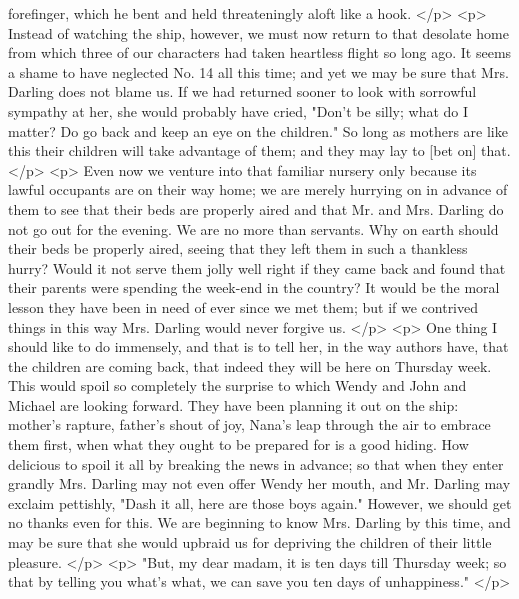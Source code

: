       forefinger, which he bent and held threateningly aloft like a hook.
    </p>
    <p>
      Instead of watching the ship, however, we must now return to that desolate
      home from which three of our characters had taken heartless flight so long
      ago. It seems a shame to have neglected No. 14 all this time; and yet we
      may be sure that Mrs. Darling does not blame us. If we had returned sooner
      to look with sorrowful sympathy at her, she would probably have cried,
      "Don't be silly; what do I matter? Do go back and keep an eye on the
      children." So long as mothers are like this their children will take
      advantage of them; and they may lay to [bet on] that.
    </p>
    <p>
      Even now we venture into that familiar nursery only because its lawful
      occupants are on their way home; we are merely hurrying on in advance of
      them to see that their beds are properly aired and that Mr. and Mrs.
      Darling do not go out for the evening. We are no more than servants. Why
      on earth should their beds be properly aired, seeing that they left them
      in such a thankless hurry? Would it not serve them jolly well right if
      they came back and found that their parents were spending the week-end in
      the country? It would be the moral lesson they have been in need of ever
      since we met them; but if we contrived things in this way Mrs. Darling
      would never forgive us.
    </p>
    <p>
      One thing I should like to do immensely, and that is to tell her, in the
      way authors have, that the children are coming back, that indeed they will
      be here on Thursday week. This would spoil so completely the surprise to
      which Wendy and John and Michael are looking forward. They have been
      planning it out on the ship: mother's rapture, father's shout of joy,
      Nana's leap through the air to embrace them first, when what they ought to
      be prepared for is a good hiding. How delicious to spoil it all by
      breaking the news in advance; so that when they enter grandly Mrs. Darling
      may not even offer Wendy her mouth, and Mr. Darling may exclaim pettishly,
      "Dash it all, here are those boys again." However, we should get no thanks
      even for this. We are beginning to know Mrs. Darling by this time, and may
      be sure that she would upbraid us for depriving the children of their
      little pleasure.
    </p>
    <p>
      "But, my dear madam, it is ten days till Thursday week; so that by telling
      you what's what, we can save you ten days of unhappiness."
    </p>
